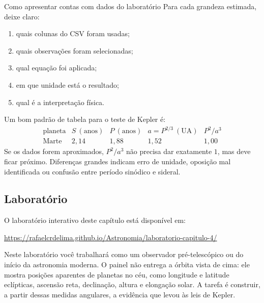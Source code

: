 \documentclass[11pt,a4paper]{article}
\begin{document}
\begin{lessonblock}{Como apresentar contas com dados do laboratório}
Para cada grandeza estimada, deixe claro:
\begin{enumerate}
\item quais colunas do CSV foram usadas;
\item quais observações foram selecionadas;
\item qual equação foi aplicada;
\item em que unidade está o resultado;
\item qual é a interpretação física.
\end{enumerate}
Um bom padrão de tabela para o teste de Kepler é:
\[
\begin{array}{c|c|c|c|c}
\text{planeta} & S\ (\text{anos}) & P\ (\text{anos}) & a=P^{2/3}\ (\mathrm{UA}) & P^2/a^3\\
\hline
\text{Marte} & 2{,}14 & 1{,}88 & 1{,}52 & 1{,}00
\end{array}
\]
Se os dados forem aproximados, $P^2/a^3$ não precisa dar exatamente $1$, mas deve ficar próximo. Diferenças grandes indicam erro de unidade, oposição mal identificada ou confusão entre período sinódico e sideral.
\end{lessonblock}

\subsection*{Laboratório}
O laboratório interativo deste capítulo está disponível em:

\begin{center}
\url{https://rafaelcrdelima.github.io/Astronomia/laboratorio-capitulo-4/}
\end{center}

Neste laboratório você trabalhará como um observador pré-telescópico ou do início da astronomia moderna. O painel não entrega a órbita vista de cima: ele mostra posições aparentes de planetas no céu, como longitude e latitude eclípticas, ascensão reta, declinação, altura e elongação solar. A tarefa é construir, a partir dessas medidas angulares, a evidência que levou às leis de Kepler.
\end{document}
